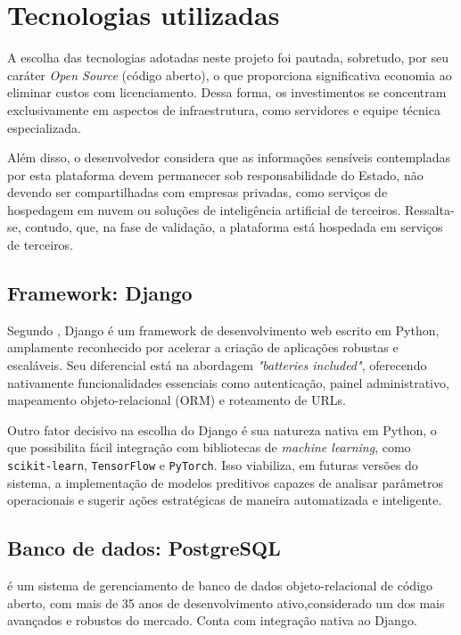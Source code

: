 \section{Tecnologias utilizadas}
\par A escolha das tecnologias adotadas neste projeto foi pautada, sobretudo, por seu caráter \textit{Open Source} (código aberto), o que proporciona significativa economia ao eliminar custos com licenciamento. Dessa forma, os investimentos se concentram exclusivamente em aspectos de infraestrutura, como servidores e equipe técnica especializada.
\par Além disso, o desenvolvedor considera que as informações sensíveis contempladas por esta plataforma devem permanecer sob responsabilidade do Estado, não devendo ser compartilhadas com empresas privadas, como serviços de hospedagem em nuvem ou soluções de inteligência artificial de terceiros. Ressalta-se, contudo, que, na fase de validação, a plataforma está hospedada em serviços de terceiros.

\subsection{Framework: Django}
\par Segundo , Django é um framework de desenvolvimento web escrito em Python, amplamente reconhecido por acelerar a criação de aplicações robustas e escaláveis. Seu diferencial está na abordagem \textit{"batteries included"}, oferecendo nativamente funcionalidades essenciais como autenticação, painel administrativo, mapeamento objeto-relacional (ORM) e roteamento de URLs.
\par Outro fator decisivo na escolha do Django é sua natureza nativa em Python, o que possibilita fácil integração com bibliotecas de \textit{machine learning}, como \texttt{scikit-learn}, \texttt{TensorFlow} e \texttt{PyTorch}. Isso viabiliza, em futuras versões do sistema, a implementação de modelos preditivos capazes de analisar parâmetros operacionais e sugerir ações estratégicas de maneira automatizada e inteligente.

\subsection{Banco de dados: PostgreSQL}
\par {} é um sistema de gerenciamento de banco de dados objeto-relacional de código aberto, com mais de 35 anos de desenvolvimento ativo,considerado um dos mais avançados e robustos do mercado. Conta com integração nativa ao Django.

